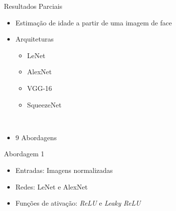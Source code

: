 
\begin{frame}{Resultados Parciais}
 \begin{itemize}
   \item Estimação de idade a partir de uma imagem de face
   \ \ \newline
    \item Arquiteturas
    \begin{itemize}
      \item LeNet
      \item AlexNet
      \item VGG-16
      \item SqueezeNet
    \end{itemize}
   \ \ \newline
   \item \alert{9 Abordagens}
   \end{itemize}
\end{frame}


\begin{frame}{Abordagem 1}
 \begin{itemize}
   \item Entradas: Imagens normalizadas
   \item Redes: LeNet e AlexNet
   \item Funções de ativação: \emph{ReLU} e \emph{Leaky ReLU}
   \end{itemize}
\end{frame}

